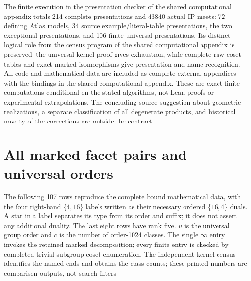 The finite execution in the presentation checker of the shared computational appendix totals 214 complete presentations and 43840 actual IP meets: 72 defining Atlas models, 34 source example/literal-table presentations, the two exceptional presentations, and 106 finite universal presentations. Its distinct logical role from the census program of the shared computational appendix is preserved: the universal-kernel proof gives exhaustion, while complete raw coset tables and exact marked isomorphisms give presentation and name recognition. All code and mathematical data are included as complete external appendices with the bindings in the shared computational appendix. These are exact finite computations conditional on the stated algorithms, not Lean proofs or experimental extrapolations. The concluding source suggestion about geometric realizations, a separate classification of all degenerate products, and historical novelty of the corrections are outside the contract.

\appendix
\section{All marked facet pairs and universal orders}
The following 107 rows reproduce the complete bound mathematical data,
with the four right-hand $\{4,16\}$ labels written as their necessary
ordered $\{16,4\}$ duals. A star in a label separates its type from its
order and suffix; it does not assert any additional duality. The last
eight rows have rank five. $u$ is the universal group order and $c$ is
the number of order-1024 classes. The single $\infty$ entry invokes the
retained marked decomposition; every finite entry is checked by
completed trivial-subgroup coset enumeration. The independent kernel
census identifies the named ends and obtains the class counts; these
printed numbers are comparison outputs, not search filters.

